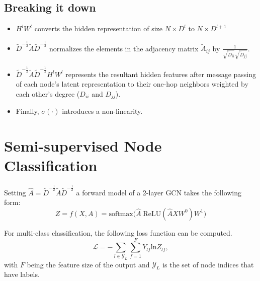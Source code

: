 \documentclass[twocolumn]{article}
\theoremstyle{plain}
\begin{document}
\subsection{Breaking it down}

\begin{itemize}
    \item $H^l W^l$ converts the hidden representation of size $N\times D^l$ to $N \times D^{l+1}$
    \item $\tilde{D}^{-\frac{1}{2}}\tilde{A}\tilde{D}^{-\frac{1}{2}}$ normalizes the elements in the adjacency matrix $\tilde{A}_{ij}$ by $\frac{1}{\sqrt{\tilde{D}_{ii}}\sqrt{\tilde{D}_{jj}}}$.
    \item $\tilde{D}^{-\frac{1}{2}}\tilde{A}\tilde{D}^{-\frac{1}{2}} H^l W^l$ represents the resultant hidden features after message passing of each node's latent representation to their one-hop neighbors weighted by each other's degree ($D_{ii}$ and $D_{jj}$).
    \item Finally, $\sigma(\cdot)$ introduces a non-linearity.
\end{itemize}

\section{Semi-supervised Node Classification}

Setting $\hat{A} = \tilde{D}^{-\frac{1}{2}}\tilde{A}\tilde{D}^{-\frac{1}{2}}$ a forward model of a 2-layer GCN takes the following form:
\begin{equation}
    Z = f(X,A) = \text{softmax}\bigl(\hat{A}\;\text{ReLU}(\hat{A}XW^0)W^1\bigr)
\end{equation}

For multi-class classification, the following loss function can be computed.
\begin{equation}
    \mathcal{L} = -\sum_{l \in \mathcal{Y}_L}\sum_{f = 1}^F Y_{lf}\text{ln}Z_{lf},
\end{equation}
with $F$ being the feature size of the output and $\mathcal{Y}_L$ is the set of node indices that have labels.
\end{document}
